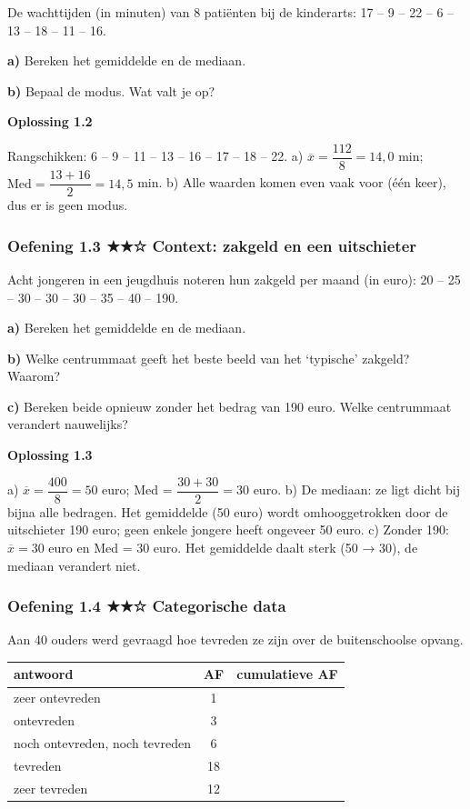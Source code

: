 De wachttijden (in minuten) van 8 patiënten bij de kinderarts: 17 – 9 – 22 – 6 – 13 – 18 – 11 – 16.

\textbf{a)} Bereken het gemiddelde en de mediaan. \lijn

\textbf{b)} Bepaal de modus. Wat valt je op? \lijn

\begin{oplossing}
\textbf{Oplossing 1.2}

Rangschikken: 6 – 9 – 11 – 13 – 16 – 17 – 18 – 22. a) $\overline{x}=\dfrac{112}{8}=14{,}0$ min; $\text{Med}=\dfrac{13+16}{2}=14{,}5$ min. b) Alle waarden komen even vaak voor (één keer), dus er is geen modus.
\end{oplossing}

\subsubsection*{Oefening 1.3 \quad ★★☆ \quad Context: zakgeld en een uitschieter}

Acht jongeren in een jeugdhuis noteren hun zakgeld per maand (in euro): 20 – 25 – 30 – 30 – 30 – 35 – 40 – 190.

\textbf{a)} Bereken het gemiddelde en de mediaan. \lijn

\textbf{b)} Welke centrummaat geeft het beste beeld van het ‘typische’ zakgeld? Waarom? \lijn

\textbf{c)} Bereken beide opnieuw zonder het bedrag van 190 euro. Welke centrummaat verandert nauwelijks? \lijn

\begin{oplossing}
\textbf{Oplossing 1.3}

a) $\overline{x}=\dfrac{400}{8}=50$ euro; Med = $\dfrac{30+30}{2}=30$ euro. b) De mediaan: ze ligt dicht bij bijna alle bedragen. Het gemiddelde (50 euro) wordt omhooggetrokken door de uitschieter 190 euro; geen enkele jongere heeft ongeveer 50 euro. c) Zonder 190: $\overline{x}=30$ euro en Med = 30 euro. Het gemiddelde daalt sterk (50 → 30), de mediaan verandert niet.
\end{oplossing}

\subsubsection*{Oefening 1.4 \quad ★★☆ \quad Categorische data}

Aan 40 ouders werd gevraagd hoe tevreden ze zijn over de buitenschoolse opvang.

\begin{tabular}{lcc}
\hline
antwoord & AF & cumulatieve AF \\
\hline
zeer ontevreden & 1 & \\
ontevreden & 3 & \\
noch ontevreden, noch tevreden & 6 & \\
tevreden & 18 & \\
zeer tevreden & 12 & \\
\hline
\end{tabular}

